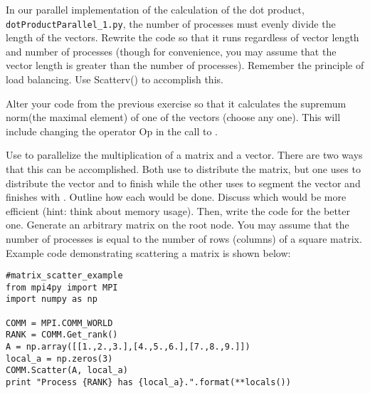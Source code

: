 \begin{problem}
In our parallel implementation of the calculation of the dot product, \texttt{dotProductParallel\_1.py}, the number of processes must evenly divide the length of the vectors. Rewrite the code so that it runs regardless of vector length and number of processes (though for convenience, you may assume that the vector length is greater than the number of processes). Remember the principle of load balancing. Use Scatterv() to accomplish this.


\end{problem}

\begin{problem}
Alter your code from the previous exercise so that it calculates the supremum norm(the maximal element) of one of the vectors (choose any one). This will include changing the operator Op in the call to .
\end{problem}

\begin{problem}
Use  to parallelize the multiplication of a matrix and a vector. There are two ways that this can be accomplished. Both use  to distribute the matrix, but one uses  to distribute the vector and  to finish while the other uses  to segment the vector and finishes with . Outline how each would be done. Discuss which would be more efficient (hint: think about memory usage). Then, write the code for the better one. Generate an arbitrary matrix on the root node. You may assume that the number of processes is equal to the number of rows (columns) of a square matrix. Example code demonstrating scattering a matrix is shown below:

\begin{lstlisting}
#matrix_scatter_example
from mpi4py import MPI
import numpy as np

COMM = MPI.COMM_WORLD
RANK = COMM.Get_rank()
A = np.array([[1.,2.,3.],[4.,5.,6.],[7.,8.,9.]])
local_a = np.zeros(3)
COMM.Scatter(A, local_a)
print "Process {RANK} has {local_a}.".format(**locals())
\end{lstlisting}
\end{problem}

